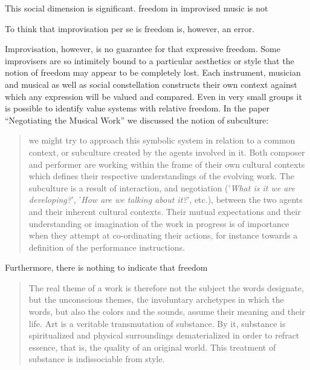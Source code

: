 \documentclass[a4paper]{article}
\begin{document}
This social dimension is significant. freedom in improvised music is not




To think that improvisation per se is freedom is, however, an error. 

Improvisation, however, is no guarantee for that expressive freedom. Some improvisers are so intimitely bound to a particular aesthetics or style that the notion of freedom may appear to be completely lost. Each instrument, musician and musical as well as social constellation constructs their own context against which any expression will be valued and compared. Even in very small groups it is possible to identify value systems with relative freedom. In the paper ``Negotiating the Musical Work'' we discussed the notion of subculture:

\begin{quotation}
  we might try to approach this symbolic system in relation to a common   context, or subculture created by the agents involved in it. Both composer   and performer are working within the frame of their own cultural contexts   which defines their respective understandings of the evolving work. The   subculture is a result of interaction, and negotiation ('\emph{What is it we     are developing?}', '\emph{How are we talking about it?}', etc.), between   the two agents and their inherent cultural contexts. Their mutual   expectations and their understanding or imagination of the work in progress   is of importance when they attempt at co-ordinating their actions, for   instance towards a definition of the performance instructions.
\end{quotation}

Furthermore, there is nothing to indicate that freedom 
\begin{quotation}
  The real theme of a work is therefore not the subject the words designate,   but the unconscious themes, the involuntary archetypes in which the words,   but also the colors and the sounds, assume their meaning and their life. Art   is a veritable transmutation of substance. By it, substance is spiritualized   and physical surroundings dematerialized in order to refract essence, that   is, the quality of an original world. This treatment of substance is   indissociable from style.\citep[p.47]{deleuze72}
\end{quotation}
\end{document}
